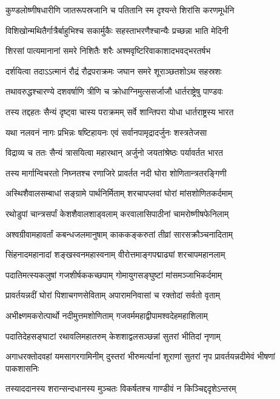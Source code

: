 \twolineshloka
{कुण्डलोष्णीषधारीणि जातरूपस्रजानि च}
{पतितानि स्म दृश्यन्ते शिरांसि करणमूर्धनि}


\twolineshloka
{विशिखोन्मथितैर्गात्रैर्बाहुभिश्च सकार्मुकैः}
{सहस्ताभरणैश्चान्यैः प्रच्छन्ना भाति मेदिनी}


\twolineshloka
{शिरसां पात्यमानानां समरे निशितैः शरैः}
{अश्मवृष्टिरिवाकाशादभवद्भरतर्षभ}


\twolineshloka
{दर्शयित्वा तदाऽऽत्मानं रौद्रं रौद्रपराक्रमः}
{जघान समरे शूराञ्छतशोऽथ सहस्रशः}


\twolineshloka
{तथावरुद्धश्चारण्ये दशवर्षाणि त्रीणि च}
{क्रोधाग्निमुत्ससर्जाजौ धार्तराष्ट्रेषु पाण्डवः}


\twolineshloka
{तस्य तद्दहतः सैन्यं दृष्ट्वा चास्य पराक्रमम्}
{सर्वे शान्तिपरा योधा धार्तराष्ट्रस्य भारत}


\twolineshloka
{यथा नलवनं नागः प्रभिन्नः षष्टिहायनः}
{एवं सर्वानपामृद्रादर्जुनः शस्त्रतेजसा}


\twolineshloka
{विद्राव्य च ततः सैन्यं त्रासयित्वा महारथान्}
{अर्जुनो जयतांश्रेष्ठः पर्यावर्तत भारत}


\twolineshloka
{तस्य मार्गान्विचरतो निघ्नतश्च रणाजिरे}
{प्रावर्तत नदी घोरा शोणितान्त्रतरङ्गिणी}


\twolineshloka
{अस्थिशैवालसम्बाधां सङ्ग्रामे पार्थनिर्मिताम्}
{शरचापप्लवां घोरां मांसशोणितकर्दमाम्}


\twolineshloka
{रथोडुपां चान्त्रसर्पां केशशैवालशाड्वलाम्}
{करवालासिपाठीनां चामरोष्णीषफेनिलाम्}


\twolineshloka
{अश्वग्रीवामहावर्तां कबन्धजलमानुषाम्}
{काककङ्करुतां तीव्रां सारसक्रौञ्चनादिताम्}


\twolineshloka
{सिंहनादमहानादां शङ्खस्वनमहास्वनाम्}
{वीरोत्तमाङ्गपद्माढ्यां शरचापमहानलाम्}


\twolineshloka
{पदातिमत्स्यकलुषां गजशीर्षककच्छपाम्}
{गोमायुगसङ्घुष्टां मांसमञ्जाभिकर्दमाम्}


\twolineshloka
{प्रावर्तयन्नदीं घोरां पिशाचगणसेविताम्}
{अपारामनिवासां च रक्तोदां सर्वतो वृताम्}


\twolineshloka
{अभीक्ष्णमकरोत्पार्थो नदीमुत्तमशोणिताम्}
{गजवर्ममहाद्वीपामश्वदेहमहाशिलाम्}


\twolineshloka
{पदातिदेहसङ्घाटां रथावलिमहातरुम्}
{केशशाद्वलसञ्छन्नां सुतरां भीतिदां नृणाम्}


\threelineshloka
{अगाधरक्तोदवहां यमसागरगामिनीम्}
{दुस्तरां भीरुमर्त्यानां शूराणां सुतरां नृप}
{प्रावर्तयन्नदीमेवं भीषणां पाकशासनिः}


\twolineshloka
{तस्याददानस्य शरान्सन्दधानस्य मुञ्चतः}
{विकर्षतश्च गाण्डीवं न किञ्चिद्ददृशेऽन्तरम्}

